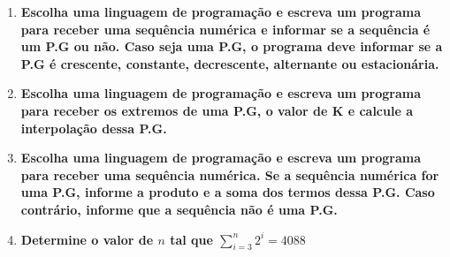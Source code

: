\begin{enumerate}
	\item \textbf{Escolha uma linguagem de programação e escreva um programa para receber uma sequência numérica e informar se a sequência é um P.G ou não. Caso seja uma P.G, o programa deve informar se a P.G é crescente, constante, decrescente, alternante ou estacionária.}
	
	
	\item \textbf{Escolha uma linguagem de programação e escreva um programa para receber os extremos de uma P.G, o valor de K e calcule a interpolação dessa P.G.}
	
	
	\item \textbf{Escolha uma linguagem de programação e escreva um programa para receber uma sequência numérica. Se a sequência numérica for uma P.G, informe a produto e a soma dos termos dessa P.G. Caso contrário, informe que a sequência não é uma P.G.}
	
	
	\item \textbf{Determine o valor de $n$ tal que $\sum_{i=3}^n 2^i = 4088$}
	
\end{enumerate}